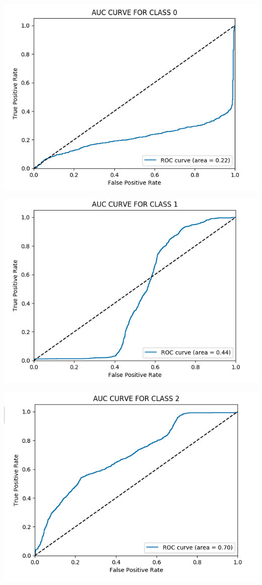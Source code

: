 \documentclass[12pt]{article}
\begin{document}
\begin{multicols*}{2}
\begin{center}
	\includegraphics[scale=0.3]{../screenshot/Overlapping/roc_0.png}

	\includegraphics[scale=0.3]{../screenshot/Overlapping/roc_1.png}

	\includegraphics[scale=0.3]{../screenshot/Overlapping/roc_2.png}
  \end{center}
  


\end{multicols*}
\end{document}
